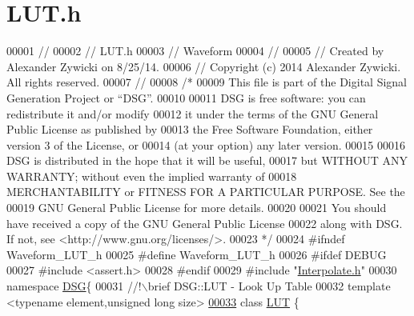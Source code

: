 \hypertarget{_l_u_t_8h_source}{\section{L\+U\+T.\+h}
\label{_l_u_t_8h_source}
}

\begin{DoxyCode}
00001 \textcolor{comment}{//}
00002 \textcolor{comment}{//  LUT.h}
00003 \textcolor{comment}{//  Waveform}
00004 \textcolor{comment}{//}
00005 \textcolor{comment}{//  Created by Alexander Zywicki on 8/25/14.}
00006 \textcolor{comment}{//  Copyright (c) 2014 Alexander Zywicki. All rights reserved.}
00007 \textcolor{comment}{//}
00008 \textcolor{comment}{/*}
00009 \textcolor{comment}{ This file is part of the Digital Signal Generation Project or “DSG”.}
00010 \textcolor{comment}{}
00011 \textcolor{comment}{ DSG is free software: you can redistribute it and/or modify}
00012 \textcolor{comment}{ it under the terms of the GNU General Public License as published by}
00013 \textcolor{comment}{ the Free Software Foundation, either version 3 of the License, or}
00014 \textcolor{comment}{ (at your option) any later version.}
00015 \textcolor{comment}{}
00016 \textcolor{comment}{ DSG is distributed in the hope that it will be useful,}
00017 \textcolor{comment}{ but WITHOUT ANY WARRANTY; without even the implied warranty of}
00018 \textcolor{comment}{ MERCHANTABILITY or FITNESS FOR A PARTICULAR PURPOSE.  See the}
00019 \textcolor{comment}{ GNU General Public License for more details.}
00020 \textcolor{comment}{}
00021 \textcolor{comment}{ You should have received a copy of the GNU General Public License}
00022 \textcolor{comment}{ along with DSG.  If not, see <http://www.gnu.org/licenses/>.}
00023 \textcolor{comment}{ */}
00024 \textcolor{preprocessor}{#ifndef Waveform\_LUT\_h}
00025 \textcolor{preprocessor}{#define Waveform\_LUT\_h}
00026 \textcolor{preprocessor}{#ifdef DEBUG}
00027 \textcolor{preprocessor}{#include <assert.h>}
00028 \textcolor{preprocessor}{#endif}
00029 \textcolor{preprocessor}{#include "\hyperlink{_interpolate_8h}{Interpolate.h}"}
00030 \textcolor{keyword}{namespace }\hyperlink{namespace_d_s_g}{DSG}\{\textcolor{comment}{}
00031 \textcolor{comment}{    //!\(\backslash\)brief DSG::LUT - Look Up Table}
00032 \textcolor{comment}{}    \textcolor{keyword}{template} <\textcolor{keyword}{typename} element,\textcolor{keywordtype}{unsigned} \textcolor{keywordtype}{long} size>
\hypertarget{_l_u_t_8h_source_l00033}{}\hyperlink{class_d_s_g_1_1_l_u_t}{00033}     \textcolor{keyword}{class }\hyperlink{class_d_s_g_1_1_l_u_t}{LUT} \{

\end{DoxyCode}
